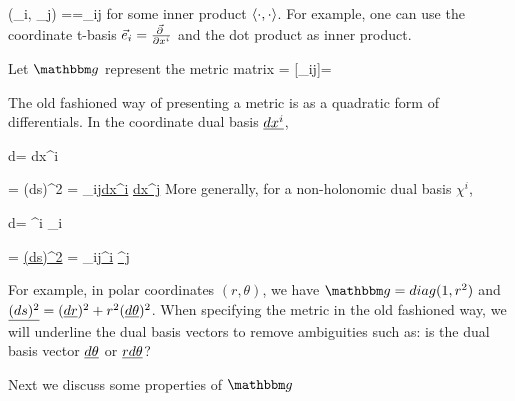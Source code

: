 \beq
\metric(\vece_i, \vece_j)
==\metric_{ij}
\eeq
for some inner product $\left\langle\cdot, \cdot\right\rangle$. For example,
one can use
the coordinate t-basis
${\vec{e}}_i=\frac{\vec{\partial}\;}{\partial x^i}$
and the dot product 
as inner product.

Let $\metric$ represent the metric
matrix
\beq
\metric = [\metric_{ij}]=
\eeq

The old fashioned way of 
presenting a metric is as a
quadratic form of 
differentials.
In the  coordinate dual basis $\ul{dx^i}$,

\beq
d\vecr = dx^i 
\eeq

\beq
{} = (ds)^2 =
\metric_{ij}\ul{dx^i} \; \ul{dx^j}
\eeq
More generally,
for a non-holonomic  dual basis $\chi^i$,

\beq
d\vecr = \chi^i \vece_i
\eeq

\beq
{}=
\ul{(ds)^2} = \metric_{ij}\ul{\chi^i}\;
\ul{\chi^j}
\eeq

For example, in 
polar coordinates $(r, \theta)$,
we have
$\metric=diag(1, r^2)$ and
$\ul{(ds)^2} = (\ul{dr})^2 + r^2 (\ul{d\theta})^2$.
When specifying the metric
in the old fashioned way, we will underline the dual basis vectors to 
remove ambiguities such as: is the dual basis vector $\ul{d\theta}$
or $\ul{rd\theta}$?

Next we discuss
some properties of $\metric$


